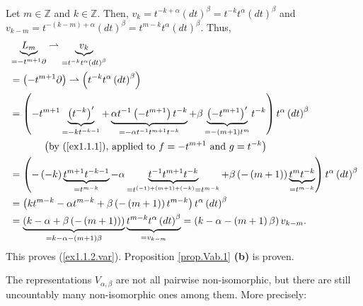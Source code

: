 \documentclass[etingof-lie.tex]{subfiles}
\begin{document}
Let $m\in\mathbb{Z}$ and $k\in\mathbb{Z}$. Then, $v_{k}=t^{-k+\alpha}\left(
dt\right)  ^{\beta}=t^{-k}t^{\alpha}\left(  dt\right)  ^{\beta}$ and
$v_{k-m}=t^{-\left(  k-m\right)  +\alpha}\left(  dt\right)  ^{\beta}%
=t^{m-k}t^{\alpha}\left(  dt\right)  ^{\beta}$. Thus,%
\begin{align*}
&  \underbrace{L_{m}}_{=-t^{m+1}\partial}\rightharpoonup\underbrace{v_{k}%
}_{=t^{-k}t^{\alpha}\left(  dt\right)  ^{\beta}}\\
&  =\left(  -t^{m+1}\partial\right)  \rightharpoonup\left(  t^{-k}t^{\alpha
}\left(  dt\right)  ^{\beta}\right) \\
&  =\left(  -t^{m+1}\underbrace{\left(  t^{-k}\right)  ^{\prime}}%
_{=-kt^{-k-1}}+\underbrace{\alpha t^{-1}\left(  -t^{m+1}\right)  t^{-k}%
}_{=-\alpha t^{-1}t^{m+1}t^{-k}}+\beta\underbrace{\left(  -t^{m+1}\right)
^{\prime}}_{=-\left(  m+1\right)  t^{m}}t^{-k}\right)  t^{\alpha}\left(
dt\right)  ^{\beta}\\
&  \ \ \ \ \ \ \ \ \ \ \left(  \text{by (\ref{ex1.1.1}), applied to
}f=-t^{m+1}\text{ and }g=t^{-k}\right) \\
&  =\left(  -\left(  -k\right)  \underbrace{t^{m+1}t^{-k-1}}_{=t^{m-k}}%
-\alpha\underbrace{t^{-1}t^{m+1}t^{-k}}_{=t^{\left(  -1\right)  +\left(
m+1\right)  +\left(  -k\right)  }=t^{m-k}}+\beta\left(  -\left(  m+1\right)
\right)  \underbrace{t^{m}t^{-k}}_{=t^{m-k}}\right)  t^{\alpha}\left(
dt\right)  ^{\beta}\\
&  =\left(  kt^{m-k}-\alpha t^{m-k}+\beta\left(  -\left(  m+1\right)  \right)
t^{m-k}\right)  t^{\alpha}\left(  dt\right)  ^{\beta}\\
&  =\underbrace{\left(  k-\alpha+\beta\left(  -\left(  m+1\right)  \right)
\right)  }_{=k-\alpha-\left(  m+1\right)  \beta}\underbrace{t^{m-k}t^{\alpha
}\left(  dt\right)  ^{\beta}}_{=v_{k-m}}=\left(  k-\alpha-\left(  m+1\right)
\beta\right)  v_{k-m}.
\end{align*}
This proves (\ref{ex1.1.2.var}). Proposition \ref{prop.Vab.1} \textbf{(b)} is proven.

The representations $V_{\alpha,\beta}$ are not all pairwise non-isomorphic,
but there are still uncountably many non-isomorphic ones among them. More precisely:
\end{document}
